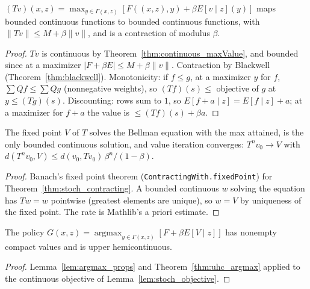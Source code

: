 \begin{theorem}
\label{thm:stoch_contracting}
\leanok
{}
$(Tv)(x, z) = \max_{y \in \Gamma(x,z)} [F((x,z), y) + \beta E[v \mid z](y)]$ maps bounded continuous functions to bounded
continuous functions, with $\|Tv\| \le M + \beta\|v\|$, and is a contraction of modulus $\beta$.
\end{theorem}
\begin{proof}
\leanok
$Tv$ is continuous by Theorem~\ref{thm:continuous_maxValue}, and bounded since at a maximizer
$|F + \beta E| \le M + \beta \|v\|$. Contraction by Blackwell (Theorem~\ref{thm:blackwell}). Monotonicity: if $f \le g$,
at a maximizer $y$ for $f$, $\sum Q f \le \sum Q g$ (nonnegative weights), so $(Tf)(s) \le$ objective of $g$ at $y \le (Tg)(s)$.
Discounting: rows sum to $1$, so $E[f + a \mid z] = E[f \mid z] + a$; at a maximizer for $f + a$ the value is
$\le (Tf)(s) + \beta a$.
\end{proof}

\begin{theorem}
\label{thm:stoch_bellman}
\leanok
{}
The fixed point $V$ of $T$ solves the Bellman equation with the max attained, is the only bounded continuous solution,
and value iteration converges: $T^n v_0 \to V$ with $d(T^n v_0, V) \le d(v_0, T v_0)\, \beta^n/(1 - \beta)$.
\end{theorem}
\begin{proof}
\leanok
Banach's fixed point theorem (\texttt{ContractingWith.fixedPoint}) for Theorem~\ref{thm:stoch_contracting}. A bounded
continuous $w$ solving the equation has $Tw = w$ pointwise (greatest elements are unique), so $w = V$ by uniqueness of the
fixed point. The rate is Mathlib's a priori estimate.
\end{proof}

\begin{theorem}
\label{thm:stoch_policy}
\leanok
{}
The policy $G(x, z) = \operatorname{argmax}_{y \in \Gamma(x,z)}[F + \beta E[V \mid z]]$ has nonempty compact values and
is upper hemicontinuous.
\end{theorem}
\begin{proof}
\leanok
Lemma~\ref{lem:argmax_props} and Theorem~\ref{thm:uhc_argmax} applied to the continuous objective of
Lemma~\ref{lem:stoch_objective}.
\end{proof}

